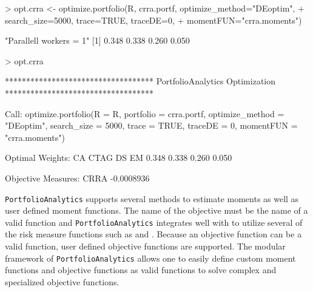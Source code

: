\documentclass[a4paper]{article}
\begin{document}
\begin{Schunk}
\begin{Sinput}
> opt.crra <- optimize.portfolio(R, crra.portf, optimize_method="DEoptim",
+                                  search_size=5000, trace=TRUE, traceDE=0,
+                                  momentFUN="crra.moments")
\end{Sinput}
\begin{Soutput}
[1] "Parallell workers = 1"
[1] 0.348 0.338 0.260 0.050
\end{Soutput}
\begin{Sinput}
> opt.crra
\end{Sinput}
\begin{Soutput}
***********************************
PortfolioAnalytics Optimization
***********************************

Call:
optimize.portfolio(R = R, portfolio = crra.portf, optimize_method = "DEoptim", 
    search_size = 5000, trace = TRUE, traceDE = 0, momentFUN = "crra.moments")

Optimal Weights:
   CA  CTAG    DS    EM 
0.348 0.338 0.260 0.050 

Objective Measures:
      CRRA 
-0.0008936 
\end{Soutput}
\end{Schunk}

\verb"PortfolioAnalytics" supports several methods to estimate moments as well as user defined moment functions. The name of the objective must be the name of a valid \R function and \verb"PortfolioAnalytics" integrates well with  to utilize several of the risk measure functions such as  and . Because an objective function can be a valid \R function, user defined objective functions are supported. The modular framework of \verb"PortfolioAnalytics" allows one to easily define custom moment functions and objective functions as valid \R functions to solve complex and specialized objective functions.


\end{document}
